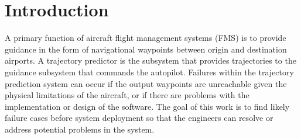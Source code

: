 


\section{Introduction}
\label{sec:introduction}

A primary function of aircraft flight management systems (FMS) is to provide guidance in the form of navigational waypoints between origin and destination airports.
A trajectory predictor is the subsystem that provides trajectories to the guidance subsystem that commands the autopilot.
Failures within the trajectory prediction system can occur if the output waypoints are unreachable given the physical limitations of the aircraft, or if there are problems with the implementation or design of the software. %
The goal of this work is to find likely failure cases before system deployment so that the engineers can resolve or address potential problems in the system. 

